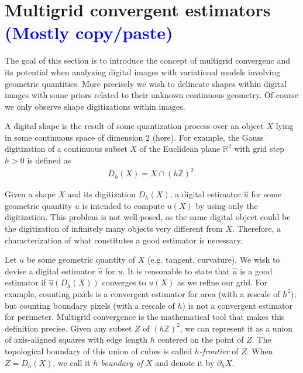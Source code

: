 \documentclass[runningheads]{llncs}
\newcommand{\todo}[1]{{\textcolor{blue}{#1}}}
\newcommand{\test}[1]{{\textcolor{red}{#1}}}
\begin{document}
\section{Multigrid convergent estimators \todo{(Mostly copy/paste)}}

The goal of this section is to  introduce the concept of multigrid convergenc and its potential when analyzing digital images with variational models involving geometric quantities. More precisely we wish to delineate shapes within digital images with some priors related to their unknown continuous geometry. Of course we only observe shape digitizations within images.


A digital shape is the result of some quantization process over an
object $X$ lying in some continuous space of dimension $2$ (here).
For example, the Gauss digitization of a continuous subset $X$ of the
Euclidean plane $\mathbb{R}^2$ with grid step $h>0$ is defined as
\begin{align*}
	D_h(X) = X \cap (h\mathbb{Z})^2.
\end{align*} 

Given a shape $X$ and its digitization $D_h(X)$, a digital estimator $\hat{u}$ for some geometric quantity $u$ is
intended to compute $u(X)$ by using only the digitization. This problem is not well-posed, as the same digital object
could be the digitization of infinitely many objects very different from $X$. Therefore, a characterization of what constitutes
a good estimator is necessary.

Let $u$ be some geometric quantity of $X$ (e.g. tangent, curvature). We wish to devise a digital estimator $\hat{u}$ for
$u$. It is reasonable to state that $\hat{u}$ is a good estimator if $\hat{u}(D_h(X))$ converges to $u(X)$ as we refine
our grid. For example, counting pixels is a convergent estimator for area (with a rescale of $h^2$); but counting
boundary pixels (with a rescale of $h$) is not a convergent estimator for perimeter. Multigrid convergence is the
mathematical tool that makes this definition precise. Given any subset $Z$ of $(h\mathbb{Z})^2$, we can represent it as a
union of axis-aligned squares with edge length $h$ centered on the point of $Z$. The topological boundary of this union
of cubes is called {\em $h$-frontier} of $Z$. When $Z=D_h(X)$, we call it {\em $h$-boundary of $X$} and denote it by
$\partial_h X$.
\end{document}
